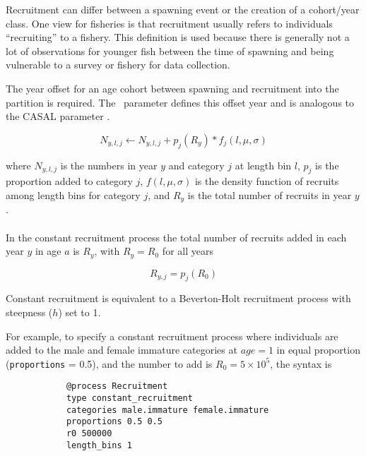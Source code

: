 Recruitment can differ between a spawning event or the creation of a cohort/year class. One view for fisheries is that recruitment usually refers to individuals \enquote{recruiting} to a fishery. This definition is used because there is generally not a lot of observations for younger fish between the time of spawning and being vulnerable to a survey or fishery for data collection.

The year offset for an age cohort between spawning and recruitment into the partition is required. The \CNAME\ parameter  defines this offset year and is analogous to the CASAL parameter .

\begin{equation}
N_{y,l,j} \leftarrow N_{y,l,j} + p_j(R_y) * f_j(l,\mu, \sigma)
\end{equation}

where $N_{y,l,j}$ is the numbers in year $y$ and category $j$ at length bin $l$, $p_j$ is the proportion added to category $j$, \(f(l,\mu, \sigma)\) is the density function of recruits among length bins for category \(j\), and $R_y$ is the total number of recruits in year $y$.


\paragraph{}\label{sec:Process-RecruitmentConstant}

In the constant recruitment process the total number of recruits added in each year $y$ in age $a$ is $R_y$, with $R_y = R_0$ for all years

\begin{equation}
	R_{y,j} = p_j(R_0)
\end{equation}

Constant recruitment is equivalent to a Beverton-Holt recruitment process with steepness ($h$) set to 1.

For example, to specify a constant recruitment process where individuals are added to the male and female immature categories at $age=1$ in equal proportion (\texttt{proportions} = 0.5), and the number to add is $R_0=5 \times 10^5$, the syntax is

{\small{\begin{verbatim}
			@process Recruitment
			type constant_recruitment
			categories male.immature female.immature
			proportions 0.5 0.5
			r0 500000
			length_bins 1
\end{verbatim}}}

